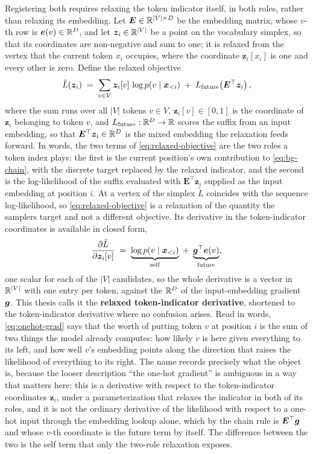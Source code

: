 Registering both requires relaxing the token indicator itself, in both roles, rather than relaxing its embedding. Let $\bm{E} \in \mathbb{R}^{|V| \times D}$ be the embedding matrix, whose $v$-th row is $\bm{e}(v) \in \mathbb{R}^{D}$, and let $\bm{z}_i \in \mathbb{R}^{|V|}$ be a point on the vocabulary simplex, so that its coordinates are non-negative and sum to one; it is relaxed from the vertex that the current token $x_i$ occupies, where the coordinate $\bm{z}_i[x_i]$ is one and every other is zero. Define the relaxed objective
\begin{equation}
    \tilde{L}(\bm{z}_i) \;=\; \sum_{v \in V} \bm{z}_i[v]\,\log p(v \mid \bm{x}_{<i}) \;+\; L_{\text{future}}\!\left(\bm{E}^\top \bm{z}_i\right),
    \label{eq:relaxed-objective}
\end{equation}
where the sum runs over all $|V|$ tokens $v \in V$, $\bm{z}_i[v] \in [0,1]$ is the coordinate of $\bm{z}_i$ belonging to token $v$, and $L_{\text{future}} : \mathbb{R}^{D} \to \mathbb{R}$ scores the suffix from an input embedding, so that $\bm{E}^\top\bm{z}_i \in \mathbb{R}^{D}$ is the mixed embedding the relaxation feeds forward. In words, the two terms of \eqref{eq:relaxed-objective} are the two roles a token index plays: the first is the current position's own contribution to \eqref{eq:bg-chain}, with the discrete target replaced by the relaxed indicator, and the second is the log-likelihood of the suffix evaluated with $\bm{E}^\top\bm{z}_i$ supplied as the input embedding at position $i$. At a vertex of the simplex $\tilde{L}$ coincides with the sequence log-likelihood, so \eqref{eq:relaxed-objective} is a relaxation of the quantity the samplers target and not a different objective. Its derivative in the token-indicator coordinates is available in closed form,
\begin{equation}
    \frac{\partial \tilde{L}}{\partial \bm{z}_i[v]} \;=\; \underbrace{\log p(v \mid \bm{x}_{<i})}_{\text{self}} \;+\; \underbrace{\bm{g}^\top \bm{e}(v)}_{\text{future}} ,
    \label{eq:onehot-grad}
\end{equation}
one scalar for each of the $|V|$ candidates, so the whole derivative is a vector in $\mathbb{R}^{|V|}$ with one entry per token, against the $\mathbb{R}^{D}$ of the input-embedding gradient $\bm{g}$. This thesis calls it the \textbf{relaxed token-indicator derivative}, shortened to the token-indicator derivative where no confusion arises. Read in words, \eqref{eq:onehot-grad} says that the worth of putting token $v$ at position $i$ is the sum of two things the model already computes: how likely $v$ is here given everything to its left, and how well $v$'s embedding points along the direction that raises the likelihood of everything to its right. The name records precisely what the object is, because the looser description ``the one-hot gradient'' is ambiguous in a way that matters here: this is a derivative with respect to the token-indicator coordinates $\bm{z}_i$, under a parameterization that relaxes the indicator in both of its roles, and it is not the ordinary derivative of the likelihood with respect to a one-hot input through the embedding lookup alone, which by the chain rule is $\bm{E}^\top \bm{g}$ and whose $v$-th coordinate is the future term by itself. The difference between the two is the self term that only the two-role relaxation exposes.

